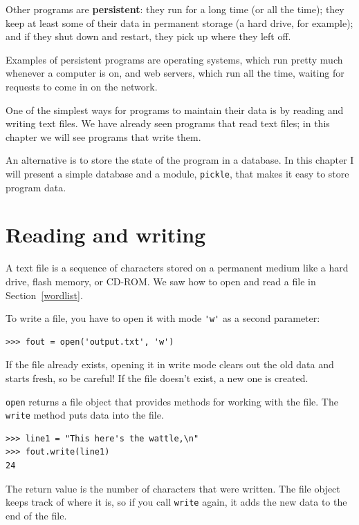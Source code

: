 \documentclass[10pt]{book}
\begin{document}
Other programs are {\bf persistent}: they run for a long time
(or all the time); they keep at least some of their data
in permanent storage (a hard drive, for example); and
if they shut down and restart, they pick up where they left off.

Examples of persistent programs are operating systems, which
run pretty much whenever a computer is on, and web servers,
which run all the time, waiting for requests to come in on
the network.

One of the simplest ways for programs to maintain their data
is by reading and writing text files.  We have already seen
programs that read text files; in this chapter we will see programs
that write them.

An alternative is to store the state of the program in a database.
In this chapter I will present a simple database and a module,
{\tt pickle}, that makes it easy to store program data.


\section{Reading and writing}

A text file is a sequence of characters stored on a permanent
medium like a hard drive, flash memory, or CD-ROM.  We saw how
to open and read a file in Section~\ref{wordlist}.

To write a file, you have to open it with mode \verb"'w'" as a second
parameter:

\begin{verbatim}
>>> fout = open('output.txt', 'w')
\end{verbatim}
%
If the file already exists, opening it in write mode clears out
the old data and starts fresh, so be careful!
If the file doesn't exist, a new one is created.

{\tt open} returns a file object that provides methods for working
with the file.
The {\tt write} method puts data into the file.

\begin{verbatim}
>>> line1 = "This here's the wattle,\n"
>>> fout.write(line1)
24
\end{verbatim}
%
The return value is the number of characters that were written.
The file object keeps track of where it is, so if
you call {\tt write} again, it adds the new data to the end of
the file.
\end{document}
